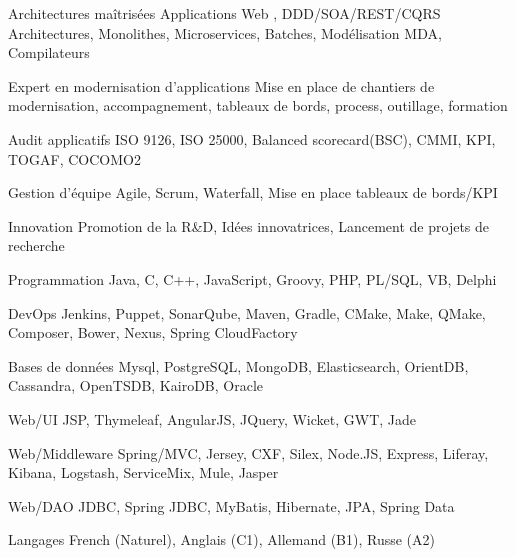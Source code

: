 

\begin{cvskills}

  \cvskill
  {Architectures maîtrisées} %
  {Applications Web , DDD/SOA/REST/CQRS Architectures, Monolithes, Microservices, Batches, Modélisation MDA, Compilateurs} %


  \cvskill
  {Expert en modernisation d'applications} %
  {Mise en place de chantiers de modernisation, accompagnement, tableaux de bords, process, outillage, formation} %


  \cvskill
  {Audit applicatifs} %
  {ISO 9126, ISO 25000, Balanced scorecard(BSC), CMMI, KPI, TOGAF, COCOMO2} %

  \cvskill
  {Gestion d'équipe} %
  {Agile, Scrum, Waterfall, Mise en place tableaux de bords/KPI} %

  \cvskill
  {Innovation} %
  {Promotion de la R\&D, Idées innovatrices, Lancement de projets de recherche} %

  \cvskill
  {Programmation} %
  {Java, C, C++, JavaScript, Groovy, PHP, PL/SQL, VB, Delphi} %
  
  \cvskill
  {DevOps} %
  {Jenkins, Puppet, SonarQube, Maven, Gradle, CMake, Make, QMake, Composer, Bower, Nexus, Spring CloudFactory} %
  
  \cvskill
  {Bases de données} %
  {Mysql, PostgreSQL, MongoDB, Elasticsearch, OrientDB, Cassandra, OpenTSDB, KairoDB, Oracle} %
  
  \cvskill
  {Web/UI} %
  {JSP, Thymeleaf, AngularJS, JQuery, Wicket, GWT, Jade} %
  
  \cvskill
  {Web/Middleware} %
  {Spring/MVC, Jersey, CXF, Silex, Node.JS, Express, Liferay, Kibana, Logstash, ServiceMix, Mule, Jasper} %
  
  
  \cvskill
  {Web/DAO} %
  {JDBC, Spring JDBC, MyBatis, Hibernate, JPA, Spring Data} %
  

  \cvskill
    {Langages} %
    {French (Naturel), Anglais (C1), Allemand (B1), Russe (A2)} %

\end{cvskills}
